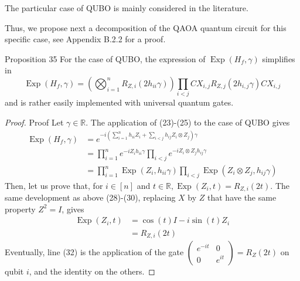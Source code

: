 The particular case of QUBO is mainly considered in the literature. 

Thus, we propose next a decomposition of the QAOA quantum circuit for this specific case, see Appendix B.2.2 for a proof.

\begin{proposition}
    Proposition 35 For the case of QUBO, the expression of $\operatorname{Exp}\left(H_{f}, \gamma\right)$ simplifies in
$$
\operatorname{Exp}\left(H_{f}, \gamma\right)=\left(\bigotimes_{i=1}^{n} R_{Z, i}\left(2 h_{i i} \gamma\right)\right) \prod_{i<j} C X_{i, j} R_{Z, j}\left(2 h_{i, j} \gamma\right) C X_{i, j}
$$
and is rather easily implemented with universal quantum gates.
\end{proposition}

\begin{proof}
    Proof Let $\gamma \in \mathbb{R}$. The application of (23)-(25) to the case of QUBO gives
$$
\begin{aligned}
\operatorname{Exp}\left(H_{f}, \gamma\right) & =e^{-i\left(\sum_{i=1}^{n} h_{i i} Z_{i}+\sum_{i<j} h_{i j} Z_{i} \otimes Z_{j}\right) \gamma} \\
& =\prod_{i=1}^{n} e^{-i Z_{i} h_{i i} \gamma} \prod_{i<j} e^{-i Z_{i} \otimes Z_{j} h_{i j} \gamma} \\
& =\prod_{i=1}^{n} \operatorname{Exp}\left(Z_{i}, h_{i i} \gamma\right) \prod_{i<j} \operatorname{Exp}\left(Z_{i} \otimes Z_{j}, h_{i j} \gamma\right)
\end{aligned}
$$
Then, let us prove that, for $i \in[n]$ and $t \in \mathbb{R}, \operatorname{Exp}\left(Z_{i}, t\right)=R_{Z, i}(2 t)$. The same development as above (28)-(30), replacing $X$ by $Z$ that have the same property $Z^{2}=I$, gives
\begin{align*}
\operatorname{Exp}\left(Z_{i}, t\right) & =\cos (t) I-i \sin (t) Z_{i}  \tag{32}\\
& =R_{Z, i}(2 t) \tag{33}
\end{align*}
Eventually, line (32) is the application of the gate $\left(\begin{array}{cc}e^{-i t} & 0 \\ 0 & e^{i t}\end{array}\right)=R_{Z}(2 t)$ on qubit $i$, and the identity on the others.


\end{proof}
